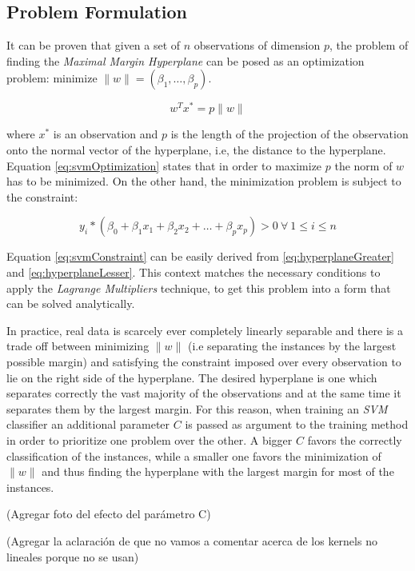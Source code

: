 \subsection{Problem Formulation}

It can be proven that given a set of $n$ observations of dimension $p$, the problem of
finding the \textit{Maximal Margin Hyperplane} can be posed as an optimization problem:
minimize $\| w \| = (\beta_{1}, \dotsc, \beta_{p})$.

\begin{equation}
\label{eq:svmOptimization}
w^{T}x^{*} = p\| w \|
\end{equation}

where $x^{*}$ is an observation and $p$ is the length of the projection of the observation
onto the normal vector of the hyperplane, i.e, the distance to the hyperplane.
Equation \ref{eq:svmOptimization} states that in order to maximize $p$ the norm of $w$
has to be minimized. On the other hand, the minimization problem is subject to the constraint:

\begin{equation}
  \label{eq:svmConstraint}
  y_{i} * (\beta_{0} + \beta_{1}x_{1} + \beta_{2}x_{2} + \dotsc + \beta_{p}x_{p}) > 0 \ \forall \ 1 \leq i \leq {n}
\end{equation}

Equation \ref{eq:svmConstraint} can be easily derived from \ref{eq:hyperplaneGreater} and
\ref{eq:hyperplaneLesser}.  This context matches the necessary conditions to apply
the \textit{Lagrange Multipliers} technique, to get this problem into a form
that can be solved analytically.

In practice, real data is scarcely ever completely linearly separable
and there is a trade off between
minimizing $\| w \|$ (i.e separating the instances by the largest possible margin)
and satisfying the constraint imposed over every
observation to lie on the right side of the hyperplane.
The desired hyperplane is one which separates correctly the vast majority of the observations and
at the same time it separates them by the largest margin. For this reason, when training an
\textit{SVM} classifier an additional parameter $C$ is passed as argument to the training
method in order to prioritize one problem over the other. A bigger $C$ favors the correctly
classification of the instances, while a smaller one favors the minimization of $\| w \|$
and thus finding the hyperplane with the largest margin for most of the instances.

(Agregar foto del efecto del parámetro C)

(Agregar la aclaración de que no vamos a comentar acerca de los kernels no lineales porque
no se usan)
